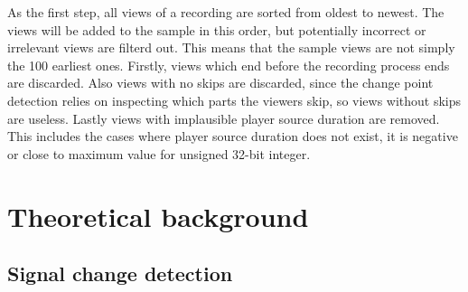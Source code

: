 
As the first step, all views of a recording are sorted from oldest to newest. The views will be added to the sample in this order, but potentially incorrect or irrelevant views are filterd out. This means that the sample views are not simply the 100 earliest ones. Firstly, views which end before the recording process ends are discarded. %
Also views with no skips are discarded, since the change point detection relies on inspecting which parts the viewers skip, so views without skips are useless. %
Lastly views with implausible player source duration are removed. This includes the cases where player source duration does not exist, it is negative or close to maximum value for unsigned 32-bit integer. %

\section{Theoretical background} \label{sec:background}

\subsection{Signal change detection} \label{subsec:methods} %



